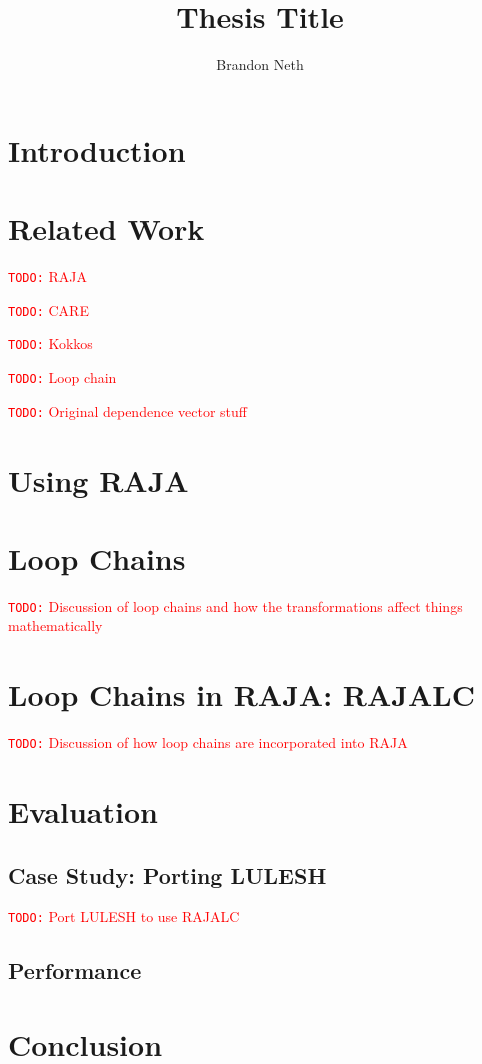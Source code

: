 \documentclass{report}
\title{Thesis Title}
\author{Brandon Neth}
\newcommand{\todo}[1]{{\textcolor{red}{{\tt{TODO:}}\,\,#1 }}}
\begin{document}
\maketitle

\chapter{Introduction}



\chapter{Related Work}


\todo{RAJA}

\todo{CARE}

\todo{Kokkos}

\todo{Loop chain}


\todo{Original dependence vector stuff}

\chapter{Using RAJA}





\chapter{Loop Chains}

\todo{Discussion of loop chains and how the transformations affect things mathematically}


\chapter{Loop Chains in RAJA: RAJALC}

\todo{Discussion of how loop chains are incorporated into RAJA}


\chapter{Evaluation}

\section{Case Study: Porting LULESH}

\todo{Port LULESH to use RAJALC}

\section{Performance}


\chapter{Conclusion}
\end{document}
